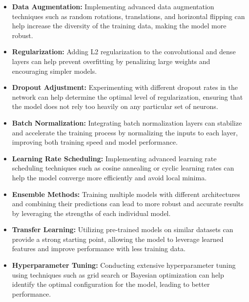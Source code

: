\begin{itemize}
    \item \textbf{Data Augmentation:} Implementing advanced data augmentation techniques such as random rotations, translations, and horizontal flipping can help increase the diversity of the training data, making the model more robust.

    \item \textbf{Regularization:} Adding L2 regularization to the convolutional and dense layers can help prevent overfitting by penalizing large weights and encouraging simpler models.

    \item \textbf{Dropout Adjustment:} Experimenting with different dropout rates in the network can help determine the optimal level of regularization, ensuring that the model does not rely too heavily on any particular set of neurons.

    \item \textbf{Batch Normalization:} Integrating batch normalization layers can stabilize and accelerate the training process by normalizing the inputs to each layer, improving both training speed and model performance.

    \item \textbf{Learning Rate Scheduling:} Implementing advanced learning rate scheduling techniques such as cosine annealing or cyclic learning rates can help the model converge more efficiently and avoid local minima.

    \item \textbf{Ensemble Methods:} Training multiple models with different architectures and combining their predictions can lead to more robust and accurate results by leveraging the strengths of each individual model.

    \item \textbf{Transfer Learning:} Utilizing pre-trained models on similar datasets can provide a strong starting point, allowing the model to leverage learned features and improve performance with less training data.

    \item \textbf{Hyperparameter Tuning:} Conducting extensive hyperparameter tuning using techniques such as grid search or Bayesian optimization can help identify the optimal configuration for the model, leading to better performance.
\end{itemize}
